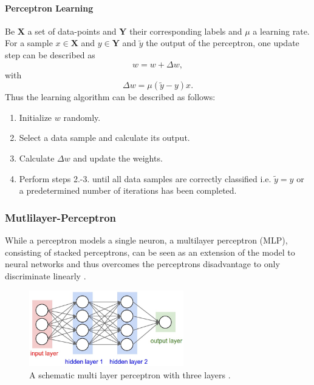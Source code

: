 \paragraph{Perceptron Learning} \label{c:perlearning}

Be $\textbf{X}$ a set of data-points and $\textbf{Y}$ their corresponding labels and $\mu$ a learning rate. 
For a sample $x \in \textbf{X}$  and $y \in \textbf{Y}$ and $\tilde{y}$ the output of the perceptron, one update step can be described as
\[ 
	w = w + \Delta w,
\]
with 
\[
	\Delta w = \mu (\tilde{y}-y) x .
\]
Thus the learning algorithm can be described as follows:

\begin{enumerate}
	\item Initialize $w$ randomly.
	\item Select a data sample and calculate its output.
	\item Calculate $\Delta w$ and update the weights.
	\item Perform steps 2.-3. until all data samples are correctly classified i.e. $\tilde{y} = y$ or a predetermined number of iterations has been completed.
\end{enumerate}


\subsubsection{Mutlilayer-Perceptron} \label{c:mlp}

While a perceptron models a single neuron, a multilayer perceptron (MLP), consisting of stacked perceptrons, can be seen as an extension of the model to neural networks and thus overcomes the perceptrons disadvantage to only discriminate linearly \cite{Goodfellow-et-al-2016-Book, rumelhart1985learning}. 

\begin{figure}
	\centering
    	\includegraphics[width=0.6\textwidth]{imgs/mlp.jpeg} 
    \caption{A schematic multi layer perceptron with three layers \cite{mlpImg}.}
	\label{fig:mlp}
\end{figure}



